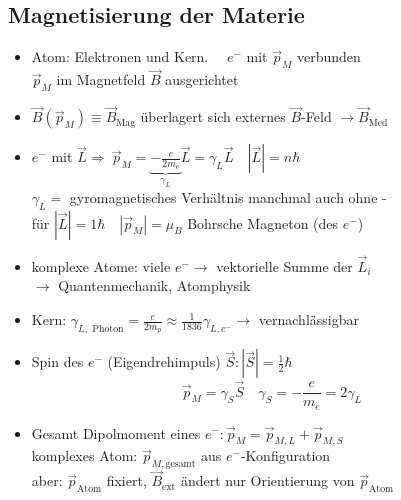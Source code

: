 \documentclass[titlepage,12pt,a4paper,ngerman]{report}
\newcommand{\tx}[1]{\textrm{#1}}
\newcommand{\ub}[1]{\underbrace{#1}}
\begin{document}
\subsection{Magnetisierung der Materie}
\begin{itemize}
	\item Atom: Elektronen und Kern. $ \quad e^- $ mit $ \vec{p}_M $ verbunden\\
	$ \vec{p}_M $ im Magnetfeld $ \vec{B} $ ausgerichtet
	\item $ \vec{B} (\vec{p}_M) \equiv \vec{B}_{\tx{Mag}} $ überlagert sich externes $ \vec{B} $-Feld $ \rightarrow \vec{B}_{\tx{Med}} $
	\item $ e^- $ mit $ \vec{L} \Rightarrow\  \vec{p}_M = \ub{-\frac{e}{2 m_e}}_{\gamma _L} \vec{L} = \gamma _L \vec{L}\quad |\vec{L}| = n \hbar $\\
	$ \gamma _L = $ gyromagnetisches Verhältnis manchmal auch ohne -\\
	für $ |\vec{L}| = 1 \hbar  \quad |\vec{p}_M| = \mu_B $ Bohrsche Magneton (des $ e^- $)
	\item komplexe Atome: viele $ e^- \rightarrow $ vektorielle Summe der $ \vec{L}_i $\\
	$ \rightarrow $ Quantenmechanik, Atomphysik
	\item Kern: $ \gamma_{L,\tx{ Photon}} = \frac{e}{2 m_p} \approx \frac{1}{1836} \gamma_{L,e^-} \rightarrow $ vernachlässigbar
	\item Spin des $ e^- $ (Eigendrehimpuls) $ \vec{S}: | \vec{S}| = \frac{1}{2} \hbar $\\
	$$ \vec{p}_M = \gamma_S \vec{S} \quad \gamma_S = - \frac{e}{m_e} = 2 \gamma_L $$
	\item Gesamt Dipolmoment eines $ e^-: \vec{p}_M = \vec{p}_{M,L} + \vec{p}_{M,S} $\\
	komplexes Atom: $ \vec{p}_{M, \tx{gesamt}} $ aus $ e^- $-Konfiguration\\
	aber: $ \vec{p}_{\tx{Atom}} $ fixiert, $ \vec{B}_{\tx{ext}} $ ändert nur Orientierung von $ \vec{p}_{\tx{Atom}} $
\end{itemize}
\end{document}
